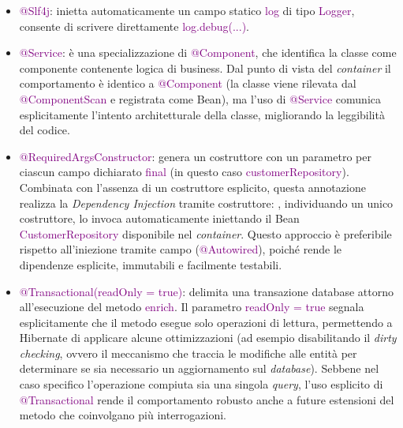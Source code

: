 \begin{itemize}
    \item \textcolor{purple}{@Slf4j}: inietta automaticamente un campo statico \textcolor{purple}{log} di tipo \textcolor{purple}{Logger}, consente di scrivere direttamente \textcolor{purple}{log.debug(...)}.
    \item \textcolor{purple}{@Service}: è una specializzazione di \textcolor{purple}{@Component}, che identifica la classe come componente contenente logica di business. Dal punto di vista del \textit{container}  il comportamento è identico a \textcolor{purple}{@Component} (la classe viene rilevata dal \textcolor{purple}{@ComponentScan} e registrata come \gls{Bean}), ma l'uso di \textcolor{purple}{@Service} comunica esplicitamente l'intento architetturale della classe, migliorando la leggibilità del codice.
    \newpage
    \item \textcolor{purple}{@RequiredArgsConstructor}: genera un costruttore con un parametro per ciascun campo dichiarato \textcolor{purple}{final} (in questo caso \textcolor{purple}{customerRepository}). Combinata con l'assenza di un costruttore esplicito, questa annotazione realizza la \textit{\gls{Dependency Injection}} tramite costruttore: , individuando un unico costruttore, lo invoca automaticamente iniettando il \gls{Bean} \textcolor{purple}{CustomerRepository} disponibile nel \textit{container}. Questo approccio è preferibile rispetto all'iniezione tramite campo (\textcolor{purple}{@Autowired}), poiché rende le dipendenze esplicite, immutabili e facilmente testabili.
    \item \textcolor{purple}{@Transactional(readOnly = true)}: delimita una transazione database attorno all'esecuzione del metodo \textcolor{purple}{enrich}. Il parametro \textcolor{purple}{readOnly = true} segnala esplicitamente che il metodo esegue solo operazioni di lettura, permettendo a \gls{Hibernate} di applicare alcune ottimizzazioni (ad esempio disabilitando il \textit{dirty checking}, ovvero il meccanismo che traccia le modifiche alle entità per determinare se sia necessario un aggiornamento sul \textit{database}). Sebbene nel caso specifico l'operazione compiuta sia una singola \textit{query}, l'uso esplicito di \textcolor{purple}{@Transactional} rende il comportamento robusto anche a future estensioni del metodo che coinvolgano più interrogazioni.
\end{itemize}

\newpage
